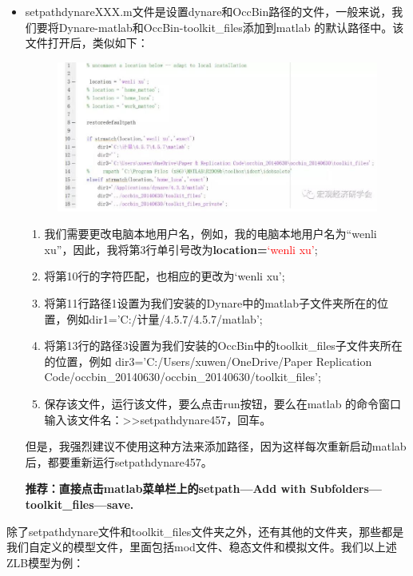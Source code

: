 \documentclass[cn,10pt,math=newtx,citestyle=gb7714-2015,bibstyle=gb7714-2015]{elegantbook}
\begin{document}
\begin{itemize}
	\item setpathdynareXXX.m文件是设置dynare和OccBin路径的文件，一般来说，我们要将Dynare-matlab和OccBin-toolkit\_files添加到matlab 的默认路径中。该文件打开后，类似如下：
	\begin{figure}[htbp!]
		\centering
		\includegraphics[width=0.8\linewidth]{FIG/setpathoccbin}
		\centering
	\end{figure}
	\begin{enumerate}
		\item 我们需要更改电脑本地用户名，例如，我的电脑本地用户名为“wenli xu”，因此，我将第3行单引号改为\textbf{location=}\textcolor{red}{‘wenli xu’};
		\item 将第10行的字符匹配，也相应的更改为‘wenli xu’;
		\item 将第11行路径1设置为我们安装的Dynare中的matlab子文件夹所在的位置，例如dir1='C:/计量/4.5.7/4.5.7/matlab';
		\item 将第13行的路径3设置为我们安装的OccBin中的toolkit\_files子文件夹所在的位置，例如 dir3='C:/Users/xuwen/OneDrive/Paper Replication Code/occbin\_20140630/occbin\_20140630/toolkit\_files';
		\item 保存该文件，运行该文件，要么点击run按钮，要么在matlab 的命令窗口输入该文件名：>>setpathdynare457，回车。
	\end{enumerate}
	
	但是，我强烈建议不使用这种方法来添加路径，因为这样每次重新启动matlab后，都要重新运行setpathdynare457。
	
	\textbf{推荐：直接点击matlab菜单栏上的setpath---Add with Subfolders---toolkit\_files---save.}
\end{itemize}

除了setpathdynare文件和toolkit\_files文件夹之外，还有其他的文件夹，那些都是我们自定义的模型文件，里面包括mod文件、稳态文件和模拟文件。我们以上述ZLB模型为例：
\end{document}
